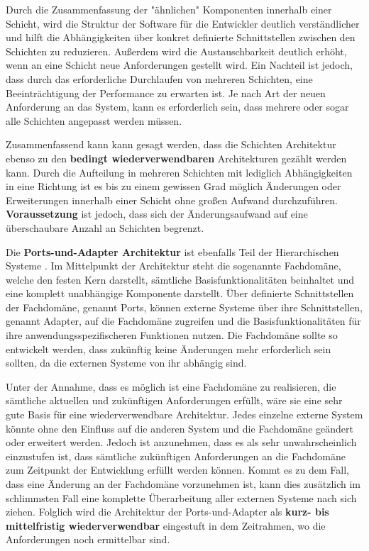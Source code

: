 \documentclass[utf8,biblatex]{lni}
\begin{document}
Durch die Zusammenfassung der "ähnlichen" Komponenten innerhalb einer Schicht, wird die Struktur der Software für die Entwickler deutlich verständlicher und hilft die Abhängigkeiten über konkret definierte Schnittstellen zwischen den Schichten zu reduzieren. Außerdem wird die Austauschbarkeit deutlich erhöht, wenn an eine Schicht neue Anforderungen gestellt wird. Ein Nachteil ist jedoch, dass durch das erforderliche Durchlaufen von mehreren Schichten, eine Beeinträchtigung der Performance zu erwarten ist. Je nach Art der neuen Anforderung an das System, kann es erforderlich sein, dass mehrere oder sogar alle Schichten angepasst werden müssen.

Zusammenfassend kann kann gesagt werden, dass die Schichten Architektur ebenso zu den \textbf{bedingt wiederverwendbaren} Architekturen gezählt werden kann. Durch die Aufteilung in mehreren Schichten mit lediglich Abhängigkeiten in eine Richtung ist es bis zu einem gewissen Grad möglich Änderungen oder Erweiterungen innerhalb einer Schicht ohne großen Aufwand durchzuführen. \textbf{Voraussetzung} ist jedoch, dass sich der Änderungsaufwand auf eine überschaubare Anzahl an Schichten begrenzt.


Die \textbf{Ports-und-Adapter Architektur} ist ebenfalls Teil der Hierarchischen Systeme . Im Mittelpunkt der Architektur steht die sogenannte Fachdomäne, welche den festen Kern darstellt, sämtliche Basisfunktionalitäten beinhaltet und eine komplett unabhängige Komponente darstellt. Über definierte Schnittstellen der Fachdomäne, genannt Ports, können externe Systeme über ihre Schnittstellen, genannt Adapter, auf die Fachdomäne zugreifen und die Basisfunktionalitäten für ihre anwendungsspezifischeren Funktionen nutzen. Die Fachdomäne sollte so entwickelt werden, dass zukünftig keine Änderungen mehr erforderlich sein sollten, da die externen Systeme von ihr abhängig sind.

Unter der Annahme, dass es möglich ist eine Fachdomäne zu realisieren, die sämtliche aktuellen und zukünftigen Anforderungen erfüllt, wäre sie eine sehr gute Basis für eine wiederverwendbare Architektur. Jedes einzelne externe System könnte ohne den Einfluss auf die anderen System und die Fachdomäne geändert oder erweitert werden. Jedoch ist anzunehmen, dass es als sehr unwahrscheinlich einzustufen ist, dass sämtliche zukünftigen Anforderungen an die Fachdomäne zum Zeitpunkt der Entwicklung erfüllt werden können. Kommt es zu dem Fall, dass eine Änderung an der Fachdomäne vorzunehmen ist, kann dies zusätzlich im schlimmsten Fall eine komplette Überarbeitung aller externen Systeme nach sich ziehen. Folglich wird die Architektur der Ports-und-Adapter als \textbf{kurz- bis mittelfristig wiederverwendbar} eingestuft in dem Zeitrahmen, wo die Anforderungen noch ermittelbar sind.
\end{document}
